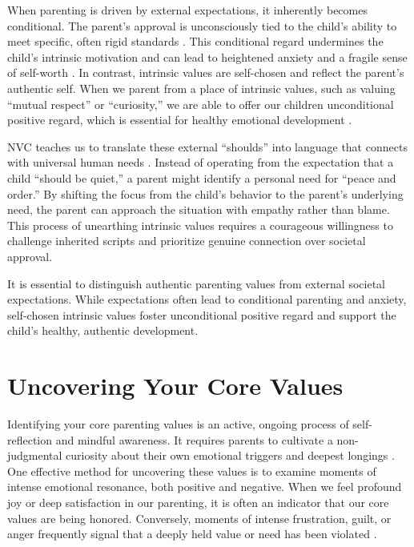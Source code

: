 When parenting is driven by external expectations, it inherently becomes conditional.
The parent's approval is unconsciously tied to the child's ability to meet specific, often rigid standards \citep{assor2004}.
This conditional regard undermines the child's intrinsic motivation and can lead to heightened anxiety and a fragile sense of self-worth \citep{ryan2017}.
In contrast, intrinsic values are self-chosen and reflect the parent's authentic self.
When we parent from a place of intrinsic values, such as valuing ``mutual respect'' or ``curiosity,'' we are able to offer our children unconditional positive regard, which is essential for healthy emotional development \citep{rogers1961}.

NVC teaches us to translate these external ``shoulds'' into language that connects with universal human needs \citep{rosenberg2003}.
Instead of operating from the expectation that a child ``should be quiet,'' a parent might identify a personal need for ``peace and order.''
By shifting the focus from the child's behavior to the parent's underlying need, the parent can approach the situation with empathy rather than blame.
This process of unearthing intrinsic values requires a courageous willingness to challenge inherited scripts and prioritize genuine connection over societal approval.

\begin{keyinsight}
It is essential to distinguish authentic parenting values from external societal expectations.
While expectations often lead to conditional parenting and anxiety, self-chosen intrinsic values foster unconditional positive regard and support the child's healthy, authentic development.
\end{keyinsight}

\section{Uncovering Your Core Values}

Identifying your core parenting values is an active, ongoing process of self-reflection and mindful awareness.
It requires parents to cultivate a non-judgmental curiosity about their own emotional triggers and deepest longings \citep{kabatzinn1990}.
One effective method for uncovering these values is to examine moments of intense emotional resonance, both positive and negative.
When we feel profound joy or deep satisfaction in our parenting, it is often an indicator that our core values are being honored.
Conversely, moments of intense frustration, guilt, or anger frequently signal that a deeply held value or need has been violated \citep{ekman1992}.

